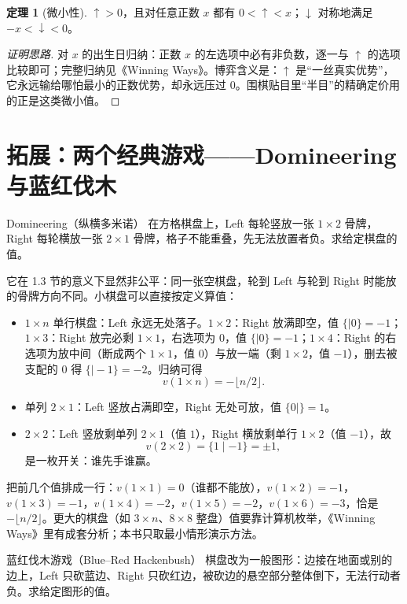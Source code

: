 \documentclass[UTF8,a4paper,11pt,oneside,openany,fontset=fandol]{ctexbook}
\theoremstyle{definition}
\newtheorem{theorem}[definition]{定理}
\begin{document}
\begin{theorem}[微小性]\label{thm:up}
$\uparrow>0$，且对任意正数 $x$ 都有 $0<\uparrow<x$；$\downarrow$ 对称地满足 $-x<\downarrow<0$。
\end{theorem}
\begin{proof}[证明思路]
对 $x$ 的出生日归纳：正数 $x$ 的左选项中必有非负数，逐一与 $\uparrow$ 的选项比较即可；完整归纳见《Winning Ways》。博弈含义是：$\uparrow$ 是“一丝真实优势”，它永远输给哪怕最小的正数优势，却永远压过 $0$。围棋贴目里“半目”的精确定价用的正是这类微小值。
\end{proof}

\section{拓展：两个经典游戏——Domineering 与蓝红伐木}
\begin{problem}{Domineering（纵横多米诺）}
在方格棋盘上，Left 每轮竖放一张 $1\times 2$ 骨牌，Right 每轮横放一张 $2\times 1$ 骨牌，格子不能重叠，先无法放置者负。求给定棋盘的值。
\end{problem}

它在 1.3 节的意义下显然非公平：同一张空棋盘，轮到 Left 与轮到 Right 时能放的骨牌方向不同。小棋盘可以直接按定义算值：
\begin{itemize}
\item $1\times n$ 单行棋盘：Left 永远无处落子。$1\times2$：Right 放满即空，值 $\{\mid 0\}=-1$；$1\times3$：Right 放完必剩 $1\times1$，右选项为 $0$，值 $\{\mid 0\}=-1$；$1\times4$：Right 的右选项为放中间（断成两个 $1\times1$，值 $0$）与放一端（剩 $1\times2$，值 $-1$），删去被支配的 $0$ 得 $\{\mid -1\}=-2$。归纳可得
\[
 v(1\times n)=-\bigl\lfloor n/2\bigr\rfloor .
\]
\item 单列 $2\times1$：Left 竖放占满即空，Right 无处可放，值 $\{0\mid\}=1$。
\item $2\times2$：Left 竖放剩单列 $2\times1$（值 $1$），Right 横放剩单行 $1\times2$（值 $-1$），故
\[
 v(2\times2)=\{1\mid -1\}=\pm1 ,
\]
是一枚开关：谁先手谁赢。
\end{itemize}
把前几个值排成一行：$v(1\times1)=0$（谁都不能放），$v(1\times2)=-1$，$v(1\times3)=-1$，$v(1\times4)=-2$，$v(1\times5)=-2$，$v(1\times6)=-3$，恰是 $-\lfloor n/2\rfloor$。更大的棋盘（如 $3\times n$、$8\times8$ 整盘）值要靠计算机枚举，《Winning Ways》里有成套分析；本书只取最小情形演示方法。

\begin{problem}{蓝红伐木游戏（Blue--Red Hackenbush）}
棋盘改为一般图形：边接在地面或别的边上，Left 只砍蓝边、Right 只砍红边，被砍边的悬空部分整体倒下，无法行动者负。求给定图形的值。
\end{problem}
\end{document}
